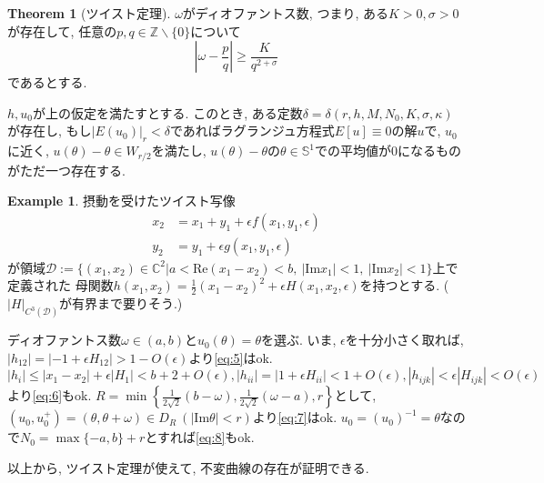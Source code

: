 \documentclass[a4paper]{ujarticle}
\numberwithin{equation}{section}
\theoremstyle{definition}
\newtheorem{theorem}{Theorem}
\newtheorem{example}{Example}
\begin{document}
        \begin{theorem}[ツイスト定理]
            $\omega$がディオファントス数, つまり, ある$K > 0, \sigma > 0$が存在して, 
            任意の$p, q \in \mathbb{Z} \backslash \{0\}$について
            \begin{equation} \label{eq:9}
                |\omega - \frac{p}{q}| \geq \frac{K}{q^{2 + \sigma}}
            \end{equation}
            であるとする.

            $h, u_0$が上の仮定を満たすとする. このとき, ある定数$\delta = \delta(r, h, M, N_0, K, \sigma, \kappa)$が存在し,
            もし$|E(u_0)|_r < \delta$であればラグランジュ方程式$E[u] \equiv 0$の解$u$で, $u_0$に近く, $u(\theta) - \theta \in W_{r/2}$を満たし, 
            $u(\theta) - \theta$の$\theta \in \mathbb{S}^1$での平均値が$0$になるものがただ一つ存在する.
        \end{theorem}

        \begin{example}
            摂動を受けたツイスト写像
            \begin{align}
                x_2 &= x_1 + y_1 + \epsilon f(x_1, y_1, \epsilon) \\
                y_2 &= y_1 + \epsilon g(x_1, y_1, \epsilon)
            \end{align}
            が領域$\mathcal{D} := \{(x_1, x_2) \in \mathbb{C}^2 | a < \mathrm{Re}(x_1 - x_2) < b, \ |\mathrm{Im} x_1| < 1, \ |\mathrm{Im} x_2| < 1\}$上で定義された
            母関数$h(x_1, x_2) = \frac{1}{2}(x_1 - x_2)^2 + \epsilon H(x_1, x_2, \epsilon)$を持つとする. ($|H|_{C^3(\mathcal{D})}$が有界まで要りそう.)

            ディオファントス数$\omega \in (a, b)$と$u_0(\theta) = \theta$を選ぶ.
            いま, $\epsilon$を十分小さく取れば, 
            $|h_{12}| = |- 1 + \epsilon H_{12}| > 1 - O(\epsilon)$より\eqref{eq:5}はok.
            $|h_{i}| \leq |x_1 - x_2| + \epsilon |H_{1}| < b + 2 + O(\epsilon), |h_{ii}| = |1 + \epsilon H_{ii}|  < 1 + O(\epsilon), |h_{ijk}| < \epsilon|H_{ijk}| < O(\epsilon)$
            より\eqref{eq:6}もok. 
            $\displaystyle R =  \min\left\{\frac{1}{2\sqrt{2}}(b - \omega), \frac{1}{2\sqrt{2}}(\omega - a), r\right\}$として, 
            $(u_0, u^{+}_0) = (\theta, \theta + \omega) \in D_{R} \ (|\mathrm{Im} \theta| < r)$より\eqref{eq:7}はok.
            $u_0 = (u_0)^{-1} = \theta$なので$N_0 = \max\{-a, b\} + r$とすれば\eqref{eq:8}もok.

            以上から, ツイスト定理が使えて, 不変曲線の存在が証明できる.
        \end{example}
\end{document}
